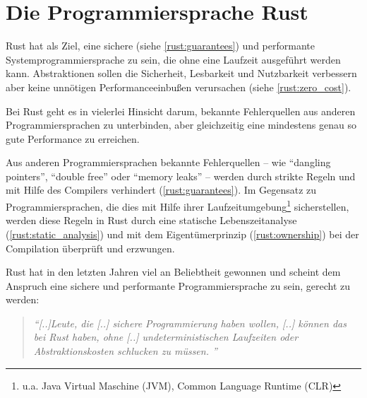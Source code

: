 
\chapter{Die Programmiersprache Rust}

Rust hat als Ziel, eine sichere (siehe \autoref{rust:guarantees}) und performante Systemprogrammiersprache zu sein, die ohne eine Laufzeit ausgeführt werden kann.
Abstraktionen sollen die Sicherheit, Lesbarkeit und Nutzbarkeit verbessern aber keine unnötigen Performanceeinbußen verursachen (siehe \autoref{rust:zero_cost}).



Bei Rust geht es in vielerlei Hinsicht darum, bekannte Fehlerquellen aus anderen Programmiersprachen zu unterbinden, aber gleichzeitig eine mindestens genau so gute Performance zu erreichen.

Aus anderen Programmiersprachen bekannte Fehlerquellen -- wie \enquote{dangling pointers}, \enquote{double free} oder \enquote{memory leaks} --  werden durch strikte Regeln und mit Hilfe des Compilers verhindert (\autoref{rust:guarantees}).
Im Gegensatz zu Programmiersprachen, die dies mit Hilfe ihrer Laufzeitumgebung\footnote{u.a. Java Virtual Maschine (JVM), Common Language Runtime (CLR)} sicherstellen, werden diese Regeln in Rust durch eine statische Lebenszeitanalyse (\autoref{rust:static_analysis}) und mit dem Eigentümerprinzip (\autoref{rust:ownership}) bei der Compilation überprüft und erzwungen.

Rust hat in den letzten Jahren viel an Beliebtheit gewonnen und scheint dem Anspruch eine sichere und performante Programmiersprache zu sein, gerecht zu werden:

\begin{quotation}
	\textit{\enquote{[..]Leute, die [..] sichere Programmierung haben wollen, [..] können das bei Rust haben, ohne [..] undeterministischen Laufzeiten oder Abstraktionskosten schlucken zu müssen. }}
	\cite[Felix von Leitner in einem Blogeintrag]{rust:fefe}
\end{quotation}

